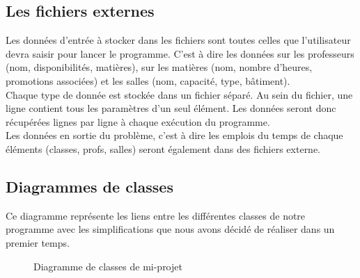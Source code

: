 \documentclass[12pt,a4paper,french]{article}
\begin{document}
\subsection{Les fichiers externes}
Les données d'entrée à stocker dans les fichiers sont toutes celles que l'utilisateur devra saisir pour lancer le programme. C'est à dire les données sur les professeurs (nom, disponibilités, matières), sur les matières (nom, nombre d'heures, promotions associées) et les salles (nom, capacité, type, bâtiment).\\

Chaque type de donnée est stockée dans un fichier séparé. Au sein du fichier, une ligne contient tous les paramètres d'un seul élément. Les données seront donc récupérées lignes par ligne à chaque exécution du programme.\\

Les données en sortie du problème, c'est à dire les emplois du temps de chaque éléments (classes, profs, salles) seront également dans des fichiers externe.

\subsection{Diagrammes de classes}
Ce diagramme représente les liens entre les différentes classes de notre programme avec les simplifications que nous avons décidé de réaliser dans un premier temps.\\
\begin{figure}[! ht ]
    \centering
    \begin{minipage}[t]{14 cm}
        \centering
        \caption {Diagramme de classes de mi-projet}
    \end{minipage}
\end{figure}
\end{document}
